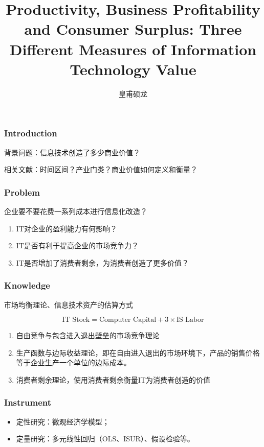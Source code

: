 \documentclass[aspectratio=169]{beamer}
\title{Productivity, Business Profitability and Consumer Surplus: Three Different Measures of Information Technology Value}
\author{皇甫硕龙}
\begin{document}
    \maketitle

    \begin{frame}
        \frametitle{Introduction}
    
        背景问题：信息技术创造了多少商业价值？

        相关文献：时间区间？产业门类？商业价值如何定义和衡量？
    
    \end{frame}

    \begin{frame}
        \frametitle{Problem}
    
        企业要不要花费一系列成本进行信息化改造？

        \begin{enumerate}
            \item IT对企业的盈利能力有何影响？
            \item IT是否有利于提高企业的市场竞争力？
            \item IT是否增加了消费者剩余，为消费者创造了更多价值？
        \end{enumerate}
    
    \end{frame}

    \begin{frame}
        \frametitle{Knowledge}

        市场均衡理论、信息技术资产的估算方式

        \begin{equation}
            \text{IT Stock} = \text{Computer Capital} + 3\times \text{IS Labor}
        \end{equation}
    
        \begin{enumerate}
            \item 自由竞争与包含进入退出壁垒的市场竞争理论
            \item 生产函数与边际收益理论，即在自由进入退出的市场环境下，产品的销售价格等于企业生产一个单位的边际成本。
            \item 消费者剩余理论，使用消费者剩余衡量IT为消费者创造的价值
        \end{enumerate}
    
    \end{frame}

    \begin{frame}
        \frametitle{Instrument}
    
        \begin{itemize}
            \item 定性研究：微观经济学模型；
            \item 定量研究：多元线性回归（OLS、ISUR）、假设检验等。
        \end{itemize}
    
    \end{frame}
\end{document}
